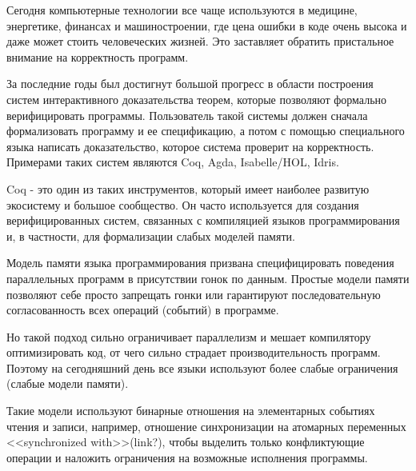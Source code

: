 \documentclass[times
              ]{itmo-student-thesis}
\begin{document}

\tableofcontents

\startprefacepage



Сегодня компьютерные технологии все чаще используются в медицине, энергетике, финансах и
машиностроении, где цена ошибки в коде очень высока и даже может стоить человеческих жизней.
Это заставляет обратить пристальное внимание на корректность программ.

За последние годы был достигнут большой прогресс в области построения систем интерактивного
доказательства теорем, которые позволяют формально верифицировать программы.
Пользователь такой системы должен сначала формализовать программу и ее спецификацию, а потом с помощью
специального языка написать доказательство, которое система проверит на корректность.
Примерами таких систем являются Coq\cite{intro_to_coq}, Agda, Isabelle/HOL, Idris.

Coq - это один из таких инструментов, который имеет наиболее развитую экосистему и большое сообщество.
Он часто используется для создания верифицированных систем, связанных с компиляцией языков
программирования\cite{comp-cert, vellvm} и, в частности, для формализации слабых моделей
памяти\cite{rc11, imm}.

Модель памяти языка программирования призвана специфицировать поведения параллельных программ в
присутствии гонок по данным.
Простые модели памяти позволяют себе просто запрещать гонки или гарантируют последовательную
согласованность всех операций (событий) в программе.

Но такой подход сильно ограничивает параллелизм и мешает компилятору оптимизировать код, от чего сильно
страдает производительность программ.
Поэтому на сегодняшний день все языки используют более слабые ограничения (слабые модели памяти).

Такие модели используют бинарные отношения на элементарных событиях чтения и записи, например,
отношение синхронизации на атомарных переменных <<synchronized with>>(link?), чтобы выделить только
конфликтующие операции и наложить ограничения на возможные исполнения программы.
\end{document}
